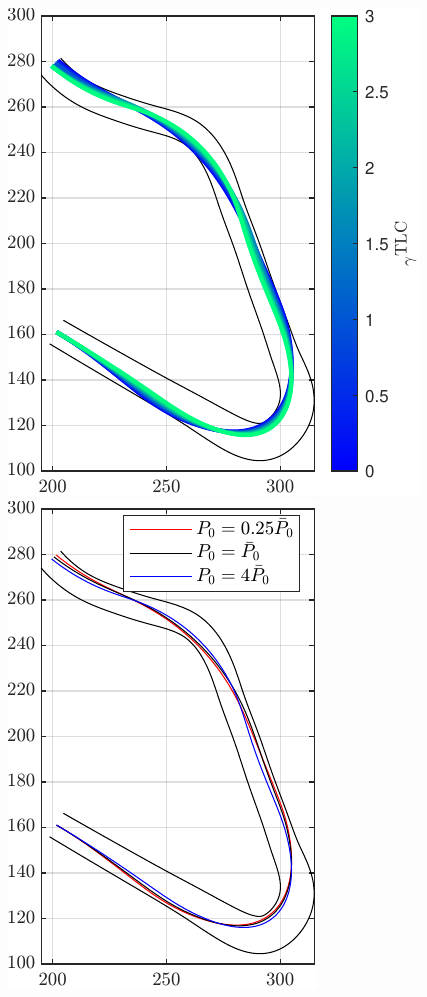 \begin{figure}
	\centering
	\includegraphics{Fig/gamma_sensitivity.pdf}
	\hfill
	\includegraphics{Fig/Pzero_sensitivity.pdf}
	\caption{}
	\label{fig:ol_sensitivities}
\end{figure}

